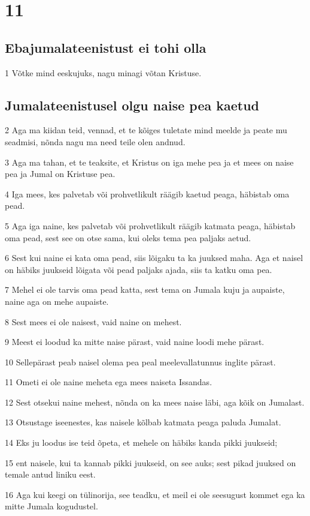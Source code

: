 \chapter{11}

\section*{Ebajumalateenistust ei tohi olla}

\par 1 Võtke mind eeskujuks, nagu minagi võtan Kristuse.

\section*{Jumalateenistusel olgu naise pea kaetud}

\par 2 Aga ma kiidan teid, vennad, et te kõiges tuletate mind meelde ja peate mu seadmisi, nõnda nagu ma need teile olen andnud.
\par 3 Aga ma tahan, et te teaksite, et Kristus on iga mehe pea ja et mees on naise pea ja Jumal on Kristuse pea.
\par 4 Iga mees, kes palvetab või prohvetlikult räägib kaetud peaga, häbistab oma pead.
\par 5 Aga iga naine, kes palvetab või prohvetlikult räägib katmata peaga, häbistab oma pead, sest see on otse sama, kui oleks tema pea paljaks aetud.
\par 6 Sest kui naine ei kata oma pead, siis lõigaku ta ka juuksed maha. Aga et naisel on häbiks juukseid lõigata või pead paljaks ajada, siis ta katku oma pea.
\par 7 Mehel ei ole tarvis oma pead katta, sest tema on Jumala kuju ja aupaiste, naine aga on mehe aupaiste.
\par 8 Sest mees ei ole naisest, vaid naine on mehest.
\par 9 Meest ei loodud ka mitte naise pärast, vaid naine loodi mehe pärast.
\par 10 Sellepärast peab naisel olema pea peal meelevallatunnus inglite pärast.
\par 11 Ometi ei ole naine meheta ega mees naiseta Issandas.
\par 12 Sest otsekui naine mehest, nõnda on ka mees naise läbi, aga kõik on Jumalast.
\par 13 Otsustage iseenestes, kas naisele kõlbab katmata peaga paluda Jumalat.
\par 14 Eks ju loodus ise teid õpeta, et mehele on häbiks kanda pikki juukseid;
\par 15 ent naisele, kui ta kannab pikki juukseid, on see auks; sest pikad juuksed on temale antud liniku eest.
\par 16 Aga kui keegi on tülinorija, see teadku, et meil ei ole seesugust kommet ega ka mitte Jumala kogudustel.


